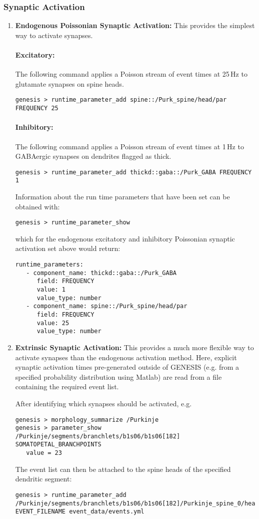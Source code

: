 \documentclass[12pt]{article}
\begin{document}
\subsubsection*{Synaptic Activation}
\begin{enumerate}
   \item{\bf Endogenous Poissonian Synaptic Activation:} This provides the simplest way to activate synapses.
   \paragraph{Excitatory:} The following command applies a Poisson stream of event times at 25\,Hz to glutamate synapses on spine heads.
\begin{verbatim}
genesis > runtime_parameter_add spine::/Purk_spine/head/par FREQUENCY 25
\end{verbatim}
   \paragraph{Inhibitory:} The following command applies a Poisson stream of event times at 1\,Hz to GABAergic synapses on dendrites flagged as thick.
\begin{verbatim}
genesis > runtime_parameter_add thickd::gaba::/Purk_GABA FREQUENCY 1
\end{verbatim}
Information about the run time parameters that have been set can be obtained with:
\begin{verbatim}
genesis > runtime_parameter_show
\end{verbatim}
which for the endogenous excitatory and inhibitory Poissonian synaptic activation set above would return:
\begin{verbatim} 
runtime_parameters:
   - component_name: thickd::gaba::/Purk_GABA
      field: FREQUENCY
      value: 1
      value_type: number
   - component_name: spine::/Purk_spine/head/par
      field: FREQUENCY
      value: 25
      value_type: number
 \end{verbatim}
    
   \item{\bf Extrinsic Synaptic Activation:} This provides a much more flexible way to activate synapses than the endogenous activation method. Here, explicit synaptic activation times pre-generated outside of GENESIS (e.g. from a specified probability distribution using Matlab) are read from a file containing the required event list.
   
   After identifying which synapses should be activated, e.g.
   \begin{verbatim}
genesis > morphology_summarize /Purkinje
genesis > parameter_show /Purkinje/segments/branchlets/b1s06/b1s06[182] SOMATOPETAL_BRANCHPOINTS
   value = 23 
   \end{verbatim}
   The event list can then be attached to the spine heads of the specified dendritic segment:
   \begin{verbatim}
genesis > runtime_parameter_add /Purkinje/segments/branchlets/b1s06/b1s06[182]/Purkinje_spine_0/head/par/synapse EVENT_FILENAME event_data/events.yml
   \end{verbatim}   
\end{enumerate}
\end{document}
